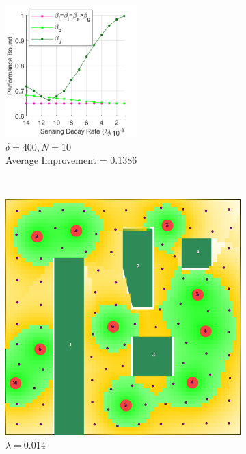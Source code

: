 \documentclass[conference]{IEEEtran}
\begin{document}
\begin{figure}[!b]
    \centering
    \begin{subfigure}[t]{\columnwidth}
        \centering
        \includegraphics[width=2in]{Figures/Gen2.png}
        \caption{$\delta=400, N=10$ \\ Average Improvement = $0.1386$}
    \end{subfigure}%
    \\
    \centering
    \begin{subfigure}[t]{0.105\textwidth}
        \centering
        \includegraphics[width=\textwidth]{Figures/Gen2_1.png}
        \caption{$\lambda=0.014$}
    \end{subfigure}\hspace{3mm}
    \begin{subfigure}[t]{0.105\textwidth}
        \centering

\end{subfigure}
\end{figure}
\end{document}
